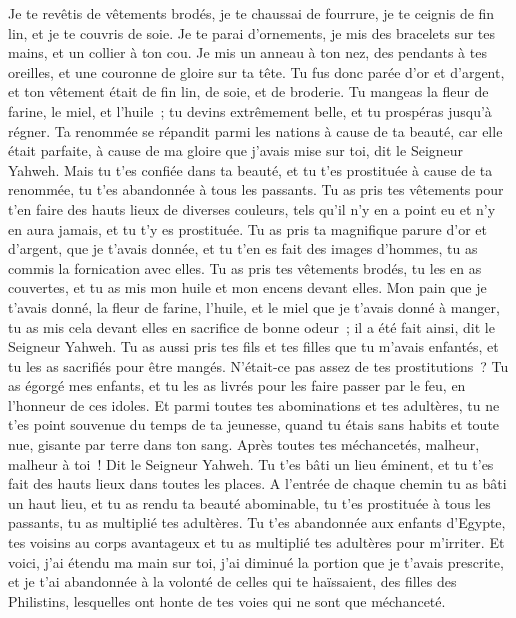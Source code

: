 \begin{multicols}{2}
Je te revêtis de vêtements brodés, je te chaussai de fourrure, je te ceignis de fin lin, et je te couvris de soie.
Je te parai d'ornements, je mis des bracelets sur tes mains, et un collier à ton cou.
Je mis un anneau à ton nez, des pendants à tes oreilles, et une couronne de gloire sur ta tête.
Tu fus donc parée d'or et d'argent, et ton vêtement était de fin lin, de soie, et de broderie. Tu mangeas la fleur de farine, le miel, et l'huile~; tu devins extrêmement belle, et tu prospéras jusqu'à régner.
Ta renommée se répandit parmi les nations à cause de ta beauté, car elle était parfaite, à cause de ma gloire que j'avais mise sur toi, dit le Seigneur Yahweh.
Mais tu t'es confiée dans ta beauté, et tu t'es prostituée à cause de ta renommée, tu t'es abandonnée à tous les passants.
Tu as pris tes vêtements pour t'en faire des hauts lieux de diverses couleurs, tels qu'il n'y en a point eu et n'y en aura jamais, et tu t'y es prostituée.
Tu as pris ta magnifique parure d'or et d'argent, que je t'avais donnée, et tu t'en es fait des images d'hommes, tu as commis la fornication avec elles.
Tu as pris tes vêtements brodés, tu les en as couvertes, et tu as mis mon huile et mon encens devant elles.
Mon pain que je t'avais donné, la fleur de farine, l'huile, et le miel que je t'avais donné à manger, tu as mis cela devant elles en sacrifice de bonne odeur~; il a été fait ainsi, dit le Seigneur Yahweh.
Tu as aussi pris tes fils et tes filles que tu m'avais enfantés, et tu les as sacrifiés pour être mangés. N'était-ce pas assez de tes prostitutions~?
Tu as égorgé mes enfants, et tu les as livrés pour les faire passer par le feu, en l'honneur de ces idoles.
Et parmi toutes tes abominations et tes adultères, tu ne t'es point souvenue du temps de ta jeunesse, quand tu étais sans habits et toute nue, gisante par terre dans ton sang.
Après toutes tes méchancetés, malheur, malheur à toi~! Dit le Seigneur Yahweh.
Tu t'es bâti un lieu éminent, et tu t'es fait des hauts lieux dans toutes les places.
A l'entrée de chaque chemin tu as bâti un haut lieu, et tu as rendu ta beauté abominable, tu t'es prostituée à tous les passants, tu as multiplié tes adultères.
Tu t'es abandonnée aux enfants d'Egypte, tes voisins au corps avantageux et tu as multiplié tes adultères pour m'irriter.
Et voici, j'ai étendu ma main sur toi, j'ai diminué la portion que je t'avais prescrite, et je t'ai abandonnée à la volonté de celles qui te haïssaient, des filles des Philistins, lesquelles ont honte de tes voies qui ne sont que méchanceté.

\end{multicols}
